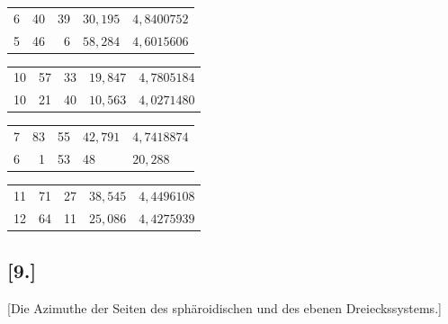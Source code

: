 \documentclass[12pt,a4paper]{article}
\theoremstyle{plain}
\theoremstyle{definition}
\theoremstyle{remark}
\begin{document}
\begin{center}
\medskip
\noindent
\begin{tabular}[t]{r|r@{${}^{\circ}$}r@{${}'$}l|l}
  6 & 40 & 39 & $30{,}195$ & $4{,}8400752$ \\
  5 & 46 & 6 & $58{,}284$ & $4{,}6015606$ \\
\end{tabular}\hfill\begin{tabular}[t]{r|r@{${}^{\circ}$}r@{${}'$}l|l}
  10 & 57 & 33 & $19{,}847$ & $4{,}7805184$ \\
  10 & 21 & 40 & $10{,}563$ & $4{,}0271480$ \\
\end{tabular}

\medskip
\noindent
\begin{tabular}[t]{r|r@{${}^{\circ}$}r@{${}'$}l|l}
  7 & 83 & 55 & $42{,}791$ & $4{,}7418874$ \\
  6 & 1 & 53 & 48 & $20{,}288$ \\
\end{tabular}\hfill\begin{tabular}[t]{r|r@{${}^{\circ}$}r@{${}'$}l|l}
  11 & 71 & 27 & $38{,}545$ & $4{,}4496108$ \\
  12 & 64 & 11 & $25{,}086$ & $4{,}4275939$ \\
\end{tabular}

\end{center}
\normalsize

\newpage
\subsection*{[9.]}
\label{subsec:netz9}

[Die Azimuthe der Seiten des sph\"aroidischen und des ebenen Dreieckssystems.]
\end{document}
